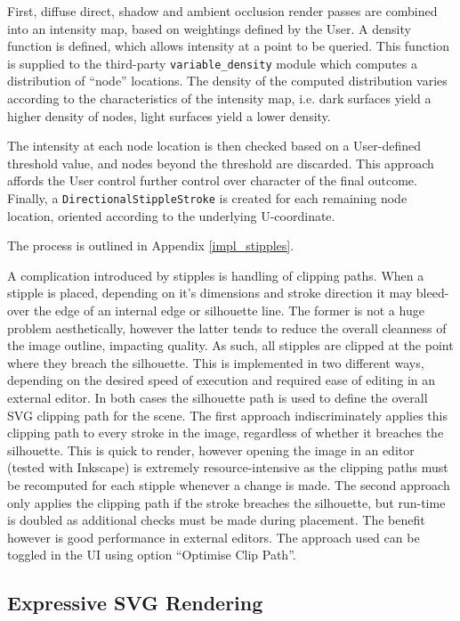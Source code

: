 {First, diffuse direct, shadow and ambient occlusion render passes are combined into an intensity map, based on weightings defined by the User.
A density function is defined, which allows intensity at a point to be queried.
This function is supplied to the third-party \texttt{variable\_density} module which computes a distribution of ``node'' locations.
The density of the computed distribution varies according to the characteristics of the intensity map, i.e. dark surfaces yield a higher density of nodes, light surfaces yield a lower density.

The intensity at each node location is then checked based on a User-defined threshold value, and nodes beyond the threshold are discarded.
This approach affords the User control further control over character of the final outcome.
Finally, a \texttt{DirectionalStippleStroke} is created for each remaining node location, oriented according to the underlying U-coordinate.

The process is outlined in Appendix \ref{impl_stipples}.

A complication introduced by stipples is handling of clipping paths.
When a stipple is placed, depending on it's dimensions and stroke direction it may bleed-over the edge of an internal edge or silhouette line.
The former is not a huge problem aesthetically, however the latter tends to reduce the overall cleanness of the image outline, impacting quality.
As such, all stipples are clipped at the point where they breach the silhouette.
This is implemented in two different ways, depending on the desired speed of execution and required ease of editing in an external editor.
In both cases the silhouette path is used to define the overall SVG clipping path for the scene.
The first approach indiscriminately applies this clipping path to every stroke in the image, regardless of whether it breaches the silhouette.
This is quick to render, however opening the image in an editor (tested with Inkscape) is extremely resource-intensive as the clipping paths must be recomputed for each stipple whenever a change is made.
The second approach only applies the clipping path if the stroke breaches the silhouette, but run-time is doubled as additional checks must be made during placement.
The benefit however is good performance in external editors.
The approach used can be toggled in the UI using option ``Optimise Clip Path''.

\subsection{Expressive SVG Rendering}

}
